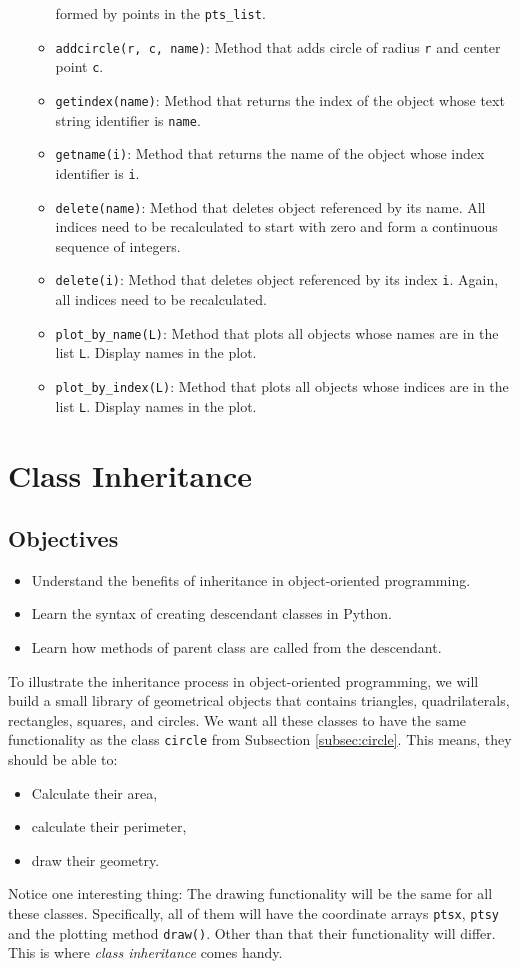 \begin{enumerate}
\begin{itemize}
      formed by points in the {\tt pts\_list}. 
\item {\tt addcircle(r, c, name)}: Method that adds circle of radius {\tt r} and center point {\tt c}.
\item {\tt getindex(name)}: Method that returns the index of the object whose text string identifier is {\tt name}.
\item {\tt getname(i)}: Method that returns the name of the object whose index identifier is {\tt i}.
\item {\tt delete(name)}: Method that deletes object referenced by its name. All indices need to be 
      recalculated to start with zero and form a continuous sequence of integers. 
\item {\tt delete(i)}: Method that deletes object referenced by its index {\tt i}. Again, all indices need to be 
      recalculated.
\item {\tt plot\_by\_name(L)}: Method that plots all objects whose names are in the list {\tt L}. Display names in the plot.
\item {\tt plot\_by\_index(L)}: Method that plots all objects whose indices are in the list {\tt L}. Display names in the plot.
\end{itemize}
\end{enumerate}

\section{Class Inheritance}

\subsection{Objectives}

\begin{itemize}
\item Understand the benefits of inheritance in object-oriented programming.
\item Learn the syntax of creating descendant classes in Python.
\item Learn how methods of parent class are called from the descendant. 
\end{itemize}
To illustrate the inheritance process in object-oriented programming, we will
build a small library of geometrical objects that contains 
triangles, quadrilaterals, rectangles, squares, and circles. 
We want all 
these classes to have the same functionality as the class {\tt circle} from 
Subsection \ref{subsec:circle}. This means, they should be able to:
\begin{itemize}
\item Calculate their area,
\item calculate their perimeter,
\item draw their geometry.
\end{itemize}
Notice one interesting thing: The drawing functionality will be 
the same for all these classes. Specifically, all of them will have the coordinate 
arrays {\tt ptsx}, {\tt ptsy} and the plotting method {\tt draw()}. Other than 
that their functionality will differ. This is where {\em class inheritance} comes
handy.

